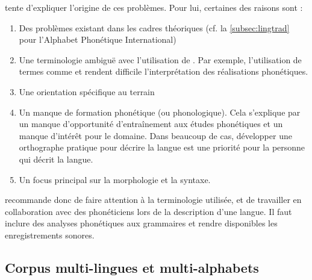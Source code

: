 \citeauthor{maddiesonPhoneticAdequacyDescriptive2021} tente d'expliquer l'origine de ces problèmes. Pour lui, certaines des raisons sont :
\begin{enumerate}
	\item Des problèmes existant dans les cadres théoriques (cf. la \autoref{subsec:lingtrad} pour l'Alphabet Phonétique International)
	\item Une terminologie ambiguë avec l'utilisation de . Par exemple, l'utilisation de termes comme  et  rendent difficile l'interprétation des réalisations phonétiques.
	\item Une orientation spécifique au terrain 
	\item Un manque de formation phonétique (ou phonologique). Cela s'explique par un manque d'opportunité d'entraînement aux études phonétiques et un manque d'intérêt pour le domaine. Dans beaucoup de cas, développer une orthographe pratique pour décrire la langue est une priorité pour la personne qui décrit la langue.
	\item Un focus principal sur la morphologie et la syntaxe.
\end{enumerate}

\textcite{maddiesonPhoneticAdequacyDescriptive2021} recommande donc de faire attention à la terminologie utilisée, et de travailler en collaboration avec des phonéticiens lors de la description d'une langue. Il faut inclure des analyses phonétiques aux grammaires et rendre disponibles les enregistrements sonores.


\subsection{Corpus multi-lingues et multi-alphabets}


